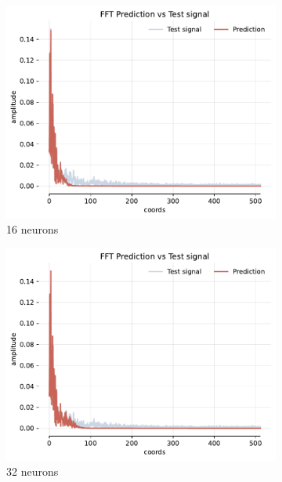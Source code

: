 \begin{figure}[!h]
    \begin{subfigure}[b]{0.32\textwidth}
        \centering
        \includegraphics[width=\textwidth]{img/ch3/fft-noise-1hl-16hf-w8.pdf}
        \caption{16 neurons}
        \label{fig:fft-noise-1hl-16hf-w8}
    \end{subfigure}
    \begin{subfigure}[b]{0.32\textwidth}
        \centering
        \includegraphics[width=\textwidth]{img/ch3/fft-noise-1hl-32hf-w8.pdf}
        \caption{32 neurons}
        \label{fig:comp-fft-noise-1hl-32hf-w8}
    \end{subfigure}
    \begin{subfigure}[b]{0.32\textwidth}

\end{subfigure}
\end{figure}
